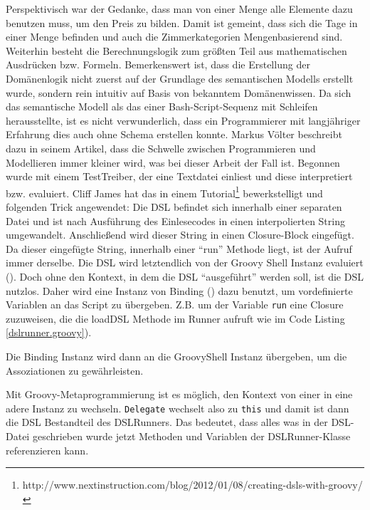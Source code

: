 \documentclass[11pt,english,ngerman, headsepline]{scrreprt}
\begin{document}
Perspektivisch war der Gedanke, dass man von einer Menge alle Elemente dazu
benutzen muss, um den Preis zu bilden. Damit ist gemeint, dass sich die Tage in
einer Menge befinden und auch die Zimmerkategorien Mengenbasierend sind.
Weiterhin besteht die Berechnungslogik zum größten Teil aus mathematischen
Ausdrücken bzw. Formeln.
Bemerkenswert ist, dass die Erstellung der Domänenlogik nicht zuerst auf der
Grundlage des semantischen Modells erstellt wurde, sondern rein intuitiv auf
Basis von bekanntem Domänenwissen. Da sich das semantische Modell als das einer
Bash-Script-Sequenz mit Schleifen herausstellte, ist es nicht verwunderlich,
dass ein Programmierer mit langjähriger Erfahrung dies auch ohne Schema erstellen
konnte. Markus Völter beschreibt dazu in seinem
Artikel\cite{10.1109/MS.2011.139}, dass die Schwelle zwischen Programmieren und Modellieren immer kleiner wird, was bei dieser
Arbeit der Fall ist.
Begonnen wurde mit einem TestTreiber, der eine Textdatei einliest und diese interpretiert bzw. evaluiert.
Cliff James hat das in einem
Tutorial\footnote{http://www.nextinstruction.com/blog/2012/01/08/creating-dsls-with-groovy/}
bewerkstelligt und folgenden Trick angewendet:
Die DSL befindet sich innerhalb einer separaten Datei und ist nach Ausführung
des Einlesecodes in einen interpolierten String umgewandelt. Anschließend wird
dieser String in einen Closure-Block eingefügt.
Da dieser eingefügte String, innerhalb einer ``run'' Methode liegt, ist der
Aufruf immer derselbe.
Die DSL wird letztendlich von der Groovy Shell Instanz evaluiert (\cite[S.
368]{koenig2007groovy}).
Doch ohne den Kontext, in dem die DSL ``ausgeführt'' werden soll, ist die DSL
nutzlos. Daher wird eine Instanz von Binding (\cite[S. 368]{koenig2007groovy})
dazu benutzt, um vordefinierte Variablen an das Script zu übergeben.
Z.B. um der Variable \texttt{run} eine Closure
zuzuweisen, die die loadDSL Methode im Runner aufruft wie im Code Listing
\ref{dslrunner.groovy}).
 

  Die Binding Instanz wird dann an die GroovyShell
Instanz übergeben, um die Assoziationen zu gewährleisten.

Mit Groovy-Metaprogrammierung ist es möglich, den Kontext von einer in eine adere Instanz zu
wechseln. \texttt{Delegate} wechselt also zu
\texttt{this} und damit ist dann die DSL Bestandteil des DSLRunners. Das
bedeutet, dass alles was in der DSL-Datei geschrieben wurde jetzt Methoden und
Variablen der DSLRunner-Klasse referenzieren kann.
 

\end{document}
